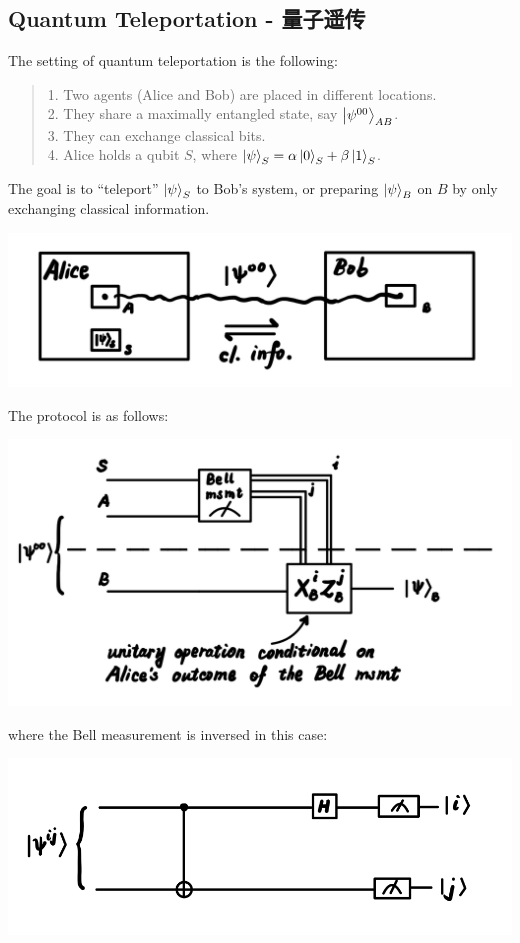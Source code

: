 \subsection{Quantum Teleportation - 量子遥传}
The setting of quantum teleportation is the following:
\begin{quote}
    1. Two agents (Alice and Bob) are placed in different locations. \\
    2. They share a maximally entangled state, say $\ket{\psi^{00}}_{AB}$. \\
    3. They can exchange classical bits. \\
    4. Alice holds a qubit $S$, where $\ket{\psi}_S = \alpha\ket{0}_S + \beta\ket{1}_S$.
\end{quote}
The goal is to ``teleport'' $\ket{\psi}_S$ to Bob's system, or preparing $\ket{\psi}_B$ on $B$ by only exchanging classical information.
\begin{center}
    \includegraphics[scale = 0.8]{qtele-setup.png}
\end{center}
The protocol is as follows:
\begin{center}
    \includegraphics[scale = 0.8]{qtele-protocol.png}
\end{center}
where the Bell measurement is inversed in this case:
\begin{center}
    \includegraphics[scale = 0.8]{bell-inverse.png}
\end{center}
